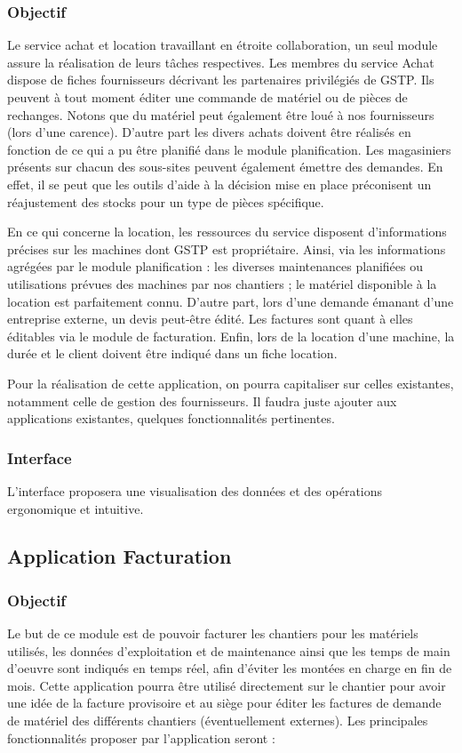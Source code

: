 	    \subsubsection{Objectif}
	    Le service achat et location travaillant en étroite collaboration, un seul module assure la réalisation de leurs tâches respectives. Les membres du service Achat dispose de fiches fournisseurs décrivant les partenaires privilégiés de GSTP. Ils peuvent à tout moment éditer une commande de matériel ou de pièces de rechanges. Notons que du matériel peut également être loué à nos fournisseurs (lors d’une carence). D’autre part les divers achats doivent être réalisés en fonction de ce qui a pu être planifié dans le module planification. 
	    Les magasiniers présents sur chacun des sous-sites peuvent également émettre des demandes. En effet, il se peut que les outils d’aide à la décision mise en place préconisent un réajustement des stocks pour un type de pièces spécifique.

	    En ce qui concerne la location, les ressources du service disposent d’informations précises sur les machines dont GSTP est propriétaire. Ainsi, via les informations agrégées par le module planification : les diverses maintenances planifiées ou utilisations prévues des machines par nos chantiers ; le matériel disponible à la location est parfaitement connu. 
	    D’autre part, lors d’une demande émanant d’une entreprise externe, un devis peut-être édité. Les factures sont quant à elles éditables via le module de facturation. Enfin, lors de la location d’une machine, la durée et le client doivent être indiqué dans un fiche location.

	    Pour la réalisation de cette application, on pourra capitaliser sur celles existantes, notamment celle de gestion des fournisseurs. Il faudra juste ajouter aux applications existantes, quelques fonctionnalités pertinentes.

	    \subsubsection{Interface}
	    L'interface proposera une visualisation des données et des opérations ergonomique et intuitive.

    \subsection {Application Facturation}

	    \subsubsection {Objectif}
	    Le but de ce module est de pouvoir facturer les chantiers pour les matériels utilisés, les données d'exploitation et de maintenance ainsi que les temps de main d'oeuvre sont indiqués en temps réel, afin d'éviter les montées en charge en fin de mois. Cette application pourra être utilisé directement sur le chantier pour avoir une idée de la facture provisoire et au siège pour éditer les factures de demande de matériel des différents chantiers (éventuellement externes). Les principales fonctionnalités proposer par l'application seront :

